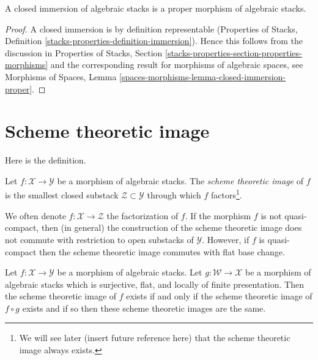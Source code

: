 \begin{lemma}
\label{lemma-closed-immersion-proper}
A closed immersion of algebraic stacks is a proper morphism of
algebraic stacks.
\end{lemma}

\begin{proof}
A closed immersion is by definition representable
(Properties of Stacks, Definition
\ref{stacks-properties-definition-immersion}).
Hence this follows from the discussion in
Properties of Stacks, Section
\ref{stacks-properties-section-properties-morphisms}
and the corresponding result for morphisms of algebraic spaces, see
Morphisms of Spaces, Lemma
\ref{spaces-morphisms-lemma-closed-immersion-proper}.
\end{proof}









\section{Scheme theoretic image}
\label{section-scheme-theoretic-image}

\noindent
Here is the definition.

\begin{definition}
\label{definition-scheme-theoretic-image}
Let $f : \mathcal{X} \to \mathcal{Y}$ be a morphism of algebraic stacks.
The {\it scheme theoretic image} of $f$ is the smallest closed substack
$\mathcal{Z} \subset \mathcal{Y}$ through which $f$
factors\footnote{We will see later (insert future reference here)
that the scheme theoretic image always exists.}.
\end{definition}

\noindent
We often denote $f : \mathcal{X} \to \mathcal{Z}$ the factorization of $f$.
If the morphism $f$ is not quasi-compact, then (in general) the
construction of the scheme theoretic image does not commute with
restriction to open substacks of $\mathcal{Y}$. However, if $f$ is
quasi-compact then the scheme theoretic image commutes with flat base change.

\begin{lemma}
\label{lemma-cover-upstairs}
Let $f : \mathcal{X} \to \mathcal{Y}$ be a morphism of algebraic stacks.
Let $g : \mathcal{W} \to \mathcal{X}$ be a morphism of algebraic stacks
which is surjective, flat, and locally of finite presentation.
Then the scheme theoretic image of $f$ exists if and only if the
scheme theoretic image of $f \circ g$ exists and if so then these
scheme theoretic images are the same.
\end{lemma}

